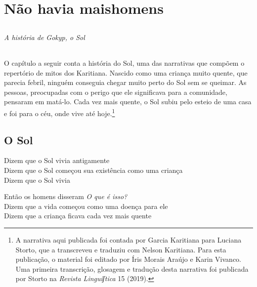 \part[Não havia mais homens]{Não havia mais\break homens}

\chapter*{}
\thispagestyle{empty}

\vspace*{\fill}
\paragraph{A história de Gokyp, o Sol} O capítulo a seguir conta a história do Sol, uma das narrativas que compõem o repertório de mitos dos Karitiana. Nascido como uma criança muito quente, que parecia febril, ninguém conseguia chegar muito perto do Sol sem se queimar. As
pessoas, preocupadas com o perigo que ele significava para a comunidade,
pensaram em matá-lo. Cada vez mais quente, o Sol subiu pelo esteio de
uma casa e foi para o céu, onde vive até hoje.\footnote{A narrativa aqui publicada foi contada por Garcia Karitiana para Luciana Storto, que a transcreveu e traduziu com Nelson Karitiana. Para esta
publicação, o material foi editado por Íris Morais Araújo e Karin
Vivanco. Uma primeira transcrição, glosagem e tradução desta narrativa foi publicada por Storto na \textit{Revista Linguíʃtica} 15 (2019).}
\vspace*{\fill}

\chapter{O Sol}

\begin{linenumbers}\begingroup\raggedright
\noindent Dizem que o Sol vivia antigamente\\
Dizem que o Sol começou sua existência como uma criança\\
Dizem que o Sol vivia
\end{linenumbers}\endgroup

\bigskip

\begin{linenumbers}\begingroup\raggedright
\noindent Então os homens disseram \textit{O que é isso?}\\
Dizem que a vida começou como uma doença para ele\\
Dizem que a criança ficava cada vez mais quente
\end{linenumbers}\endgroup

